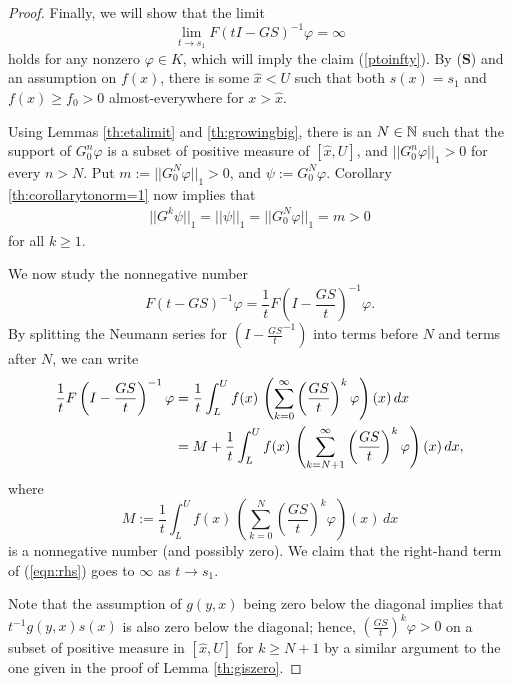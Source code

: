 \begin{proof}
	Finally, we will show that the limit
	\[\lim_{t \to s_1} F(t I - GS)^{-1} \varphi = \infty \]
	holds for any nonzero $\varphi \in K$, which will imply the claim (\ref{ptoinfty}). By (\textbf{S}) and an assumption on $f(x)$, there is some $\hat x <U$ such that both $s(x) = s_1$ and $f(x) \geq f_0 >0$ almost-everywhere for $x > \hat x$.
	
	Using Lemmas \ref{th:etalimit} and \ref{th:growingbig}, there is an $N \in \mathbb{N}$ such that the support of $G_0^n \varphi$ is a subset of positive measure of $[\hat x,U]$, and $||G_0^n\varphi||_1>0$ for every $n >N$. Put $m:=||G_0^N \varphi||_1>0$, and $\psi:= G_0^N \varphi$. Corollary \ref{th:corollarytonorm=1} now implies that 
	\begin{align}
		||G^k \psi||_1 = ||\psi||_1 = ||G_0^N \varphi||_1 = m>0
	\end{align}
	for all $k \geq 1$.
	
	We now study the nonnegative number
	\[F(t-GS)^{-1}\varphi = \frac 1 t F \left(I-\frac{GS}{t}\right)^{-1} \varphi.\]
	By splitting the Neumann series for $\left(I - \frac{GS}{t}^{-1} \right)$ into terms before $N$ and terms after $N$, we can write
	\begin{align}
		\frac 1 t F \left(I-\frac{GS}{t}\right)^{-1} \varphi &= \frac 1 t \int_L^U f(x) \, \left( \sum_{k=0}^\infty \left( \frac{GS}{t} \right)^k \varphi \right)(x) \, dx \notag \\
		&=M + \frac{1}{t} \int_L^U f(x) \, \left( \sum_{k=N+1}^\infty \left( \frac{GS}{t} \right)^k \varphi \right)(x) \, dx, \label{eqn:rhs}
	\end{align}
	where
	\[M:= \frac 1 t \int_L^U f(x) \, \left( \sum_{k=0}^N \left( \frac{GS}{t} \right)^k \varphi \right)(x) \, dx\]
	is a nonnegative number (and possibly zero). We claim that the right-hand term of (\ref{eqn:rhs}) goes to $\infty$ as $t \to s_1$.
	
	Note that the assumption of $g(y,x)$ being zero below the diagonal implies that $t^{-1} g(y,x) s(x)$ is also zero below the diagonal; hence, $\left( \frac{GS}{t} \right)^k \varphi>0$ on a subset of positive measure in $[\hat x,U]$ for $k \geq N+1$ by a similar argument to the one given in the proof of Lemma \ref{th:giszero}.
	

\end{proof}
